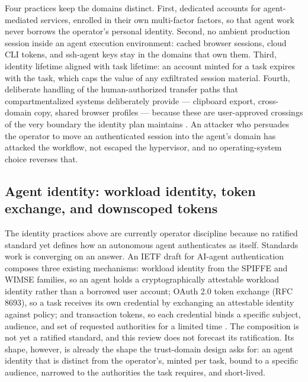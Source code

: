 \documentclass[
  english,
  9pt,
]{extarticle}
\begin{document}
Four practices keep the domains distinct. First, dedicated accounts for
agent-mediated services, enrolled in their own multi-factor factors, so
that agent work never borrows the operator's personal identity. Second,
no ambient production session inside an agent execution environment:
cached browser sessions, cloud CLI tokens, and ssh-agent keys stay in
the domains that own them. Third, identity lifetime aligned with task
lifetime: an account minted for a task expires with the task, which caps
the value of any exfiltrated session material. Fourth, deliberate
handling of the human-authorized transfer paths that compartmentalized
systems deliberately provide --- clipboard export, cross-domain copy,
shared browser profiles --- because these are user-approved crossings of
the very boundary the identity plan maintains
\citep{qubes_gui_protocol}. An attacker who persuades the operator to
move an authenticated session into the agent's domain has attacked the
workflow, not escaped the hypervisor, and no operating-system choice
reverses that.

\subsection{Agent identity: workload identity, token exchange, and
downscoped
tokens}\label{agent-identity-workload-identity-token-exchange-and-downscoped-tokens}

The identity practices above are currently operator discipline because
no ratified standard yet defines how an autonomous agent authenticates
as itself. Standards work is converging on an answer. An IETF draft for
AI-agent authentication composes three existing mechanisms: workload
identity from the SPIFFE and WIMSE families, so an agent holds a
cryptographically attestable workload identity rather than a borrowed
user account; OAuth 2.0 token exchange (RFC 8693), so a task receives
its own credential by exchanging an attestable identity against policy;
and transaction tokens, so each credential binds a specific subject,
audience, and set of requested authorities for a limited time
\citep{ietf_agent_identity}. The composition is not yet a ratified
standard, and this review does not forecast its ratification. Its shape,
however, is already the shape the trust-domain design asks for: an agent
identity that is distinct from the operator's, minted per task, bound to
a specific audience, narrowed to the authorities the task requires, and
short-lived.
\end{document}
